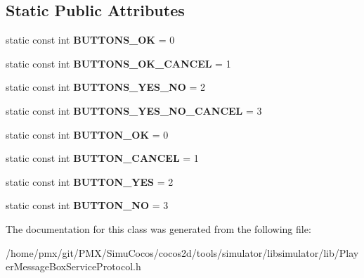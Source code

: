 \subsection*{Static Public Attributes}
\begin{DoxyCompactItemize}
\item 
\mbox{\label{classPlayerMessageBoxServiceProtocol_ae86f1c0784692f51da7290199b16b1b9}} 
static const int {\bfseries B\+U\+T\+T\+O\+N\+S\+\_\+\+OK} = 0
\item 
\mbox{\label{classPlayerMessageBoxServiceProtocol_aeb9f3acc2b596bc0f9892818ba1ef61e}} 
static const int {\bfseries B\+U\+T\+T\+O\+N\+S\+\_\+\+O\+K\+\_\+\+C\+A\+N\+C\+EL} = 1
\item 
\mbox{\label{classPlayerMessageBoxServiceProtocol_ac16ec779f2823e851e27a650c71d1e33}} 
static const int {\bfseries B\+U\+T\+T\+O\+N\+S\+\_\+\+Y\+E\+S\+\_\+\+NO} = 2
\item 
\mbox{\label{classPlayerMessageBoxServiceProtocol_a0b34a84f74b05dea5e726bd4c6ebf6f2}} 
static const int {\bfseries B\+U\+T\+T\+O\+N\+S\+\_\+\+Y\+E\+S\+\_\+\+N\+O\+\_\+\+C\+A\+N\+C\+EL} = 3
\item 
\mbox{\label{classPlayerMessageBoxServiceProtocol_adde161da30fb8640ff3b5d0961866be9}} 
static const int {\bfseries B\+U\+T\+T\+O\+N\+\_\+\+OK} = 0
\item 
\mbox{\label{classPlayerMessageBoxServiceProtocol_aafc60800a0a75286fb126ede567f902e}} 
static const int {\bfseries B\+U\+T\+T\+O\+N\+\_\+\+C\+A\+N\+C\+EL} = 1
\item 
\mbox{\label{classPlayerMessageBoxServiceProtocol_a8719f42a6b7328b482c7e6177f3013b3}} 
static const int {\bfseries B\+U\+T\+T\+O\+N\+\_\+\+Y\+ES} = 2
\item 
\mbox{\label{classPlayerMessageBoxServiceProtocol_a017490adc0fb0e83b45466b54353a946}} 
static const int {\bfseries B\+U\+T\+T\+O\+N\+\_\+\+NO} = 3
\end{DoxyCompactItemize}


The documentation for this class was generated from the following file\+:\begin{DoxyCompactItemize}
\item 
/home/pmx/git/\+P\+M\+X/\+Simu\+Cocos/cocos2d/tools/simulator/libsimulator/lib/Player\+Message\+Box\+Service\+Protocol.\+h\end{DoxyCompactItemize}
